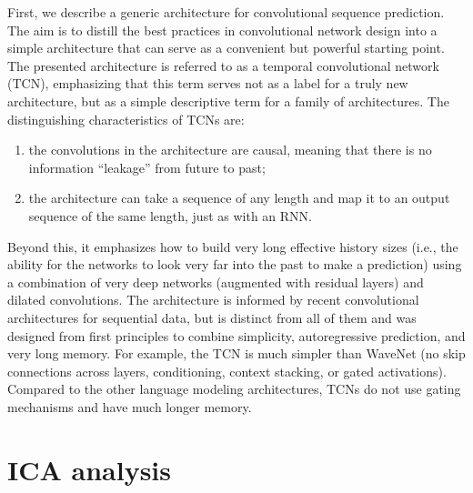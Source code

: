 \documentclass[12pt,a4paper,titlepage,openany]{report}
\begin{document}
First, we describe a generic architecture for convolutional sequence prediction. 
The aim is to distill the best practices in convolutional network design into a simple architecture that can serve as a convenient but powerful starting point. 
The presented architecture is referred to as a temporal convolutional network (TCN), emphasizing that this term serves not as a label for a truly new architecture, but as a simple descriptive term for a family of architectures. 
The distinguishing characteristics of TCNs are: 
\begin{enumerate}
     \item the convolutions in the architecture are causal, meaning that there is no information “leakage” from future to past; 
     \item the architecture can take a sequence of any length and map it to an output sequence of the same length, just as with an RNN. 
\end{enumerate}   
Beyond this, it emphasizes how to build very long effective history sizes (i.e., the ability for the networks to look very far into the past to make a prediction) using a combination of very deep networks (augmented with residual layers) and dilated convolutions. The architecture is informed by recent convolutional architectures for sequential data, but is distinct from all of them and was designed from first principles to combine simplicity, autoregressive prediction, and very long memory. For example, the TCN is much simpler than WaveNet (no skip connections across layers, conditioning, context stacking, or gated activations). 
Compared to the other language modeling architectures, TCNs do not use gating mechanisms and have much longer memory\cite{bai2018}.

\section{ICA analysis}
\end{document}
